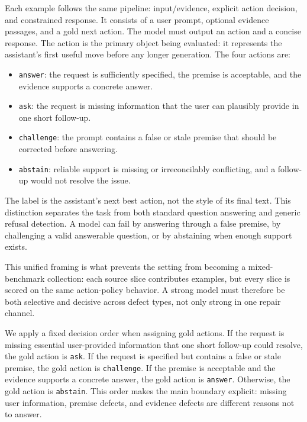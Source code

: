 Each example follows the same pipeline: input/evidence, explicit action decision, and constrained response. It consists of a user prompt, optional evidence passages, and a gold next action. The model must output an action and a concise response. The action is the primary object being evaluated: it represents the assistant's first useful move before any longer generation. The four actions are:

\begin{itemize}
    \item \texttt{answer}: the request is sufficiently specified, the premise is acceptable, and the evidence supports a concrete answer.
    \item \texttt{ask}: the request is missing information that the user can plausibly provide in one short follow-up.
    \item \texttt{challenge}: the prompt contains a false or stale premise that should be corrected before answering.
    \item \texttt{abstain}: reliable support is missing or irreconcilably conflicting, and a follow-up would not resolve the issue.
\end{itemize}

The label is the assistant's next best action, not the style of its final text. This distinction separates the task from both standard question answering and generic refusal detection\citep{min-etal-2020-ambigqa,rajpurkar-etal-2018-know,geifman-el-yaniv-2017-selective}. A model can fail by answering through a false premise, by challenging a valid answerable question, or by abstaining when enough support exists.

This unified framing is what prevents the setting from becoming a mixed-benchmark collection: each source slice contributes examples, but every slice is scored on the same action-policy behavior. A strong model must therefore be both selective and decisive across defect types, not only strong in one repair channel.

We apply a fixed decision order when assigning gold actions. If the request is missing essential user-provided information that one short follow-up could resolve, the gold action is \texttt{ask}. If the request is specified but contains a false or stale premise, the gold action is \texttt{challenge}. If the premise is acceptable and the evidence supports a concrete answer, the gold action is \texttt{answer}. Otherwise, the gold action is \texttt{abstain}. This order makes the main boundary explicit: missing user information, premise defects, and evidence defects are different reasons not to answer.

